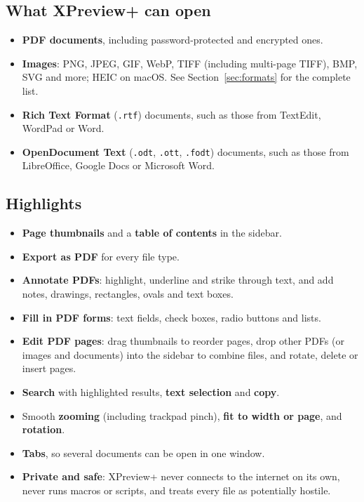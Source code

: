 \documentclass[11pt,a4paper]{article}
\newcommand{\app}{XPreview+}
\newcommand{\file}[1]{\texttt{#1}}
\begin{document}
\subsection{What \app{} can open}
\begin{itemize}
  \item \textbf{PDF documents}, including password-protected and encrypted ones.
  \item \textbf{Images}: PNG, JPEG, GIF, WebP, TIFF (including multi-page TIFF), BMP,
        SVG and more; HEIC on macOS. See Section~\ref{sec:formats} for the complete list.
  \item \textbf{Rich Text Format} (\file{.rtf}) documents, such as those from TextEdit, WordPad or Word.
  \item \textbf{OpenDocument Text} (\file{.odt}, \file{.ott}, \file{.fodt}) documents,
        such as those from LibreOffice, Google Docs or Microsoft Word.
\end{itemize}

\subsection{Highlights}
\begin{itemize}
  \item \textbf{Page thumbnails} and a \textbf{table of contents} in the sidebar.
  \item \textbf{Export as PDF} for every file type.
  \item \textbf{Annotate PDFs}: highlight, underline and strike through text, and add notes,
        drawings, rectangles, ovals and text boxes.
  \item \textbf{Fill in PDF forms}: text fields, check boxes, radio buttons and lists.
  \item \textbf{Edit PDF pages}: drag thumbnails to reorder pages, drop other PDFs (or images and
        documents) into the sidebar to combine files, and rotate, delete or insert pages.
  \item \textbf{Search} with highlighted results, \textbf{text selection} and \textbf{copy}.
  \item Smooth \textbf{zooming} (including trackpad pinch), \textbf{fit to width or page}, and \textbf{rotation}.
  \item \textbf{Tabs}, so several documents can be open in one window.
  \item \textbf{Private and safe}: \app{} never connects to the internet on its own, never runs
        macros or scripts, and treats every file as potentially hostile.
\end{itemize}
\end{document}
